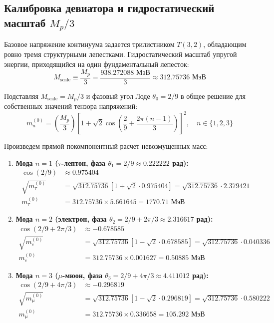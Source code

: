 \documentclass[12pt,a4paper]{article}
\begin{document}
\subsection{Калибровка девиатора и гидростатический масштаб $M_p/3$}
Базовое напряжение континуума задается трилистником $T(3,2)$, обладающим ровно тремя структурными лепестками. Гидростатический масштаб упругой энергии, приходящийся на один фундаментальный лепесток:
\begin{equation}
	M_{\text{scale}} \equiv \frac{M_p}{3} = \frac{938.272088 \text{ МэВ}}{3} \approx \mathbf{312.75736 \text{ МэВ}}
\end{equation}

Подставляя $M_{\text{scale}} = M_p/3$ и фазовый угол Лоде $\theta_0 = 2/9$ в общее решение для собственных значений тензора напряжений:
\begin{equation}
	m_n^{(0)} = \left( \frac{M_p}{3} \right) \left[ 1 + \sqrt{2} \cos\left( \frac{2}{9} + \frac{2\pi(n-1)}{3} \right) \right]^2, \quad n \in \{1, 2, 3\}
\end{equation}

Произведем прямой покомпонентный расчет невозмущенных масс:
\begin{enumerate}
	\item \textbf{Мода $n=1$ ($\tau$-лептон, фаза $\theta_1 = 2/9 \approx 0.222222$ рад):}
	\begin{align}
		\cos(2/9) &\approx 0.975404 \\
		\sqrt{m_\tau^{(0)}} &= \sqrt{312.75736} \left[ 1 + \sqrt{2} \cdot 0.975404 \right] = \sqrt{312.75736} \cdot 2.379421 \\
		m_\tau^{(0)} &= 312.75736 \times 5.661645 = \mathbf{1770.71 \text{ МэВ}}
	\end{align}
	\item \textbf{Мода $n=2$ (электрон, фаза $\theta_2 = 2/9 + 2\pi/3 \approx 2.316617$ рад):}
	\begin{align}
		\cos(2/9 + 2\pi/3) &\approx -0.678585 \\
		\sqrt{m_e^{(0)}} &= \sqrt{312.75736} \left[ 1 - \sqrt{2} \cdot 0.678585 \right] = \sqrt{312.75736} \cdot 0.040336 \\
		m_e^{(0)} &= 312.75736 \times 0.001627 = \mathbf{0.50885 \text{ МэВ}}
	\end{align}
	\item \textbf{Мода $n=3$ ($\mu$-мюон, фаза $\theta_3 = 2/9 + 4\pi/3 \approx 4.411012$ рад):}
	\begin{align}
		\cos(2/9 + 4\pi/3) &\approx -0.296819 \\
		\sqrt{m_\mu^{(0)}} &= \sqrt{312.75736} \left[ 1 - \sqrt{2} \cdot 0.296819 \right] = \sqrt{312.75736} \cdot 0.580222 \\
		m_\mu^{(0)} &= 312.75736 \times 0.336658 = \mathbf{105.292 \text{ МэВ}}
	\end{align}
\end{enumerate}
\end{document}
